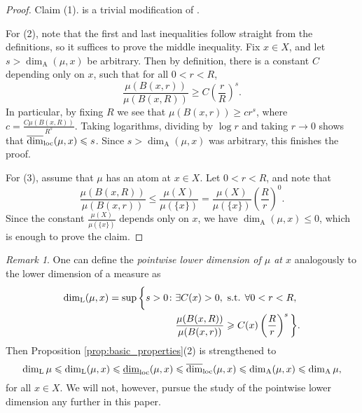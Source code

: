 \documentclass{PRM}
\newcommand{\updim}{\overline{\dim}}
\newcommand{\lowdim}{\underline{\dim}}
\newcommand{\adim}{\dim_{\mathrm{A}}}
\theoremstyle{plain}
\theoremstyle{definition}
\theoremstyle{remark}
\newtheorem{huom}[thm]{Remark}
\begin{document}
\begin{proof}
    Claim (1). is a trivial modification of \cite[Lemma 4.1.1]{F}. 
    
    For (2), note that the first and last inequalities follow straight from the definitions, so it suffices to prove the middle inequality. Fix $x\in X$, and let $s> \dim_{\mathrm{A}}(\mu,x)$ be arbitrary. Then by definition, there is a constant $C$ depending only on $x$, such that for all $0<r<R$,
    \begin{equation*}
        \frac{\mu(B(x,r))}{\mu(B(x,R))}\geq C\left(\frac{r}{R}\right)^s.
    \end{equation*}
    In particular, by fixing $R$ we see that $\mu(B(x,r))\geq c r^s$,
    where $c=\frac{C\mu(B(x,R))}{R^s}$. Taking logarithms, dividing by $\log r$ and taking $r\to 0$ shows that $\updim_{\textnormal{loc}}(\mu,x)\leq s$. Since $s>\dim_{\mathrm{A}}(\mu,x)$ was arbitrary, this finishes the proof.

    For (3), assume that $\mu$ has an atom at $x\in X$. Let $0<r<R$, and note that
    \begin{equation*}
        \frac{\mu(B(x,R))}{\mu(B(x,r))}\leq \frac{\mu(X)}{\mu(\{x\})}=\frac{\mu(X)}{\mu(\{x\})}\left(\frac{R}{r}\right)^0.
    \end{equation*}
    Since the constant $\frac{\mu(X)}{\mu(\{x\})}$ depends only on $x$, we have $\dim_{\mathrm{A}}(\mu,x)\leq 0$, which is enough to prove the claim.
\end{proof}

\begin{huom}
One can define the \emph{pointwise lower dimension of $\mu$ at $x$} analogously to the lower dimension of a measure as
\begin{align*}
    \dim_{\mathrm{L}}(\mu,x)=\sup\bigg\{s>0\colon &\exists C(x)>0,\textnormal{ s.t. }\forall0<r<R,\\
    &\frac{\mu(B(x,R))}{\mu(B(x,r))}\geq C(x)\left(\frac{R}{r}\right)^s\bigg\}.
\end{align*}
Then Proposition \ref{prop:basic_properties}(2) is strengthened to 
\begin{equation*}
    \dim_{\mathrm{L}}\mu\leq\dim_{\mathrm{L}}(\mu,x)\leq\lowdim_{\textnormal{loc}}(\mu,x)\leq\updim_{\textnormal{loc}}(\mu,x)\leq \dim_{\mathrm{A}}(\mu,x)\leq\adim\mu,
\end{equation*}
for all $x\in X$. We will not, however, pursue the study of the pointwise lower dimension any further in this paper.
\end{huom}
\end{document}
